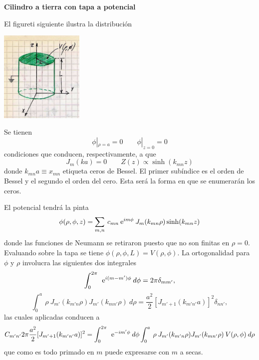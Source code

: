 \documentclass[10pt,oneside]{CBFT_book}
\begin{document}
\begin{ejemplo}{\bf Cilindro a tierra con tapa a potencial}

El figureti siguiente ilustra la distribución

\includegraphics[width=0.3\textwidth]{images/fig_ft1_cilindricasA.jpg} 

Se tienen
\[
	\phi|_{\rho=a} =0 \qquad \phi|_{z=0} =0
\]
condiciones que conducen, respectivamente, a que 
\[
	J_m(ka)=0 \qquad Z(z) \propto \sinh( k_{mn} z )
\]
donde $ k_{mn} a \equiv x_{mn} $ etiqueta ceros de Bessel. El primer subíndice es el
orden de Bessel y el segundo el orden del cero. Esta será la forma en que se enumerarán
los ceros.

El potencial tendrá la pinta
\[
	\phi(\rho,\phi,z) = \sum_{m,n} \: c_{mn} \:\mathrm{e}^{ i m \phi } \: 
	J_{m}( k_{mn} \rho ) \sinh( k_{mn} z )
\]
donde las funciones de Neumann se retiraron puesto que no son finitas en $\rho=0$.
Evaluando sobre la tapa se tiene $\phi(\rho,\phi,L) = V(\rho,\phi)$.
La ortogonalidad para $\phi$ y $\rho$ involucra las siguientes dos integrales
\[
	\int_0^{2\pi} \: \:\mathrm{e}^{ i(m-m')\phi } \: d\phi = 2 \pi \delta_{mm'},
\]
\[
	\int_0^a \: \rho \: J_{m'}( k_{m'n} \rho ) J_{m'}( k_{mn'} \rho ) \: d\rho =
	\frac{a^2}{2} [J_{m'+1}( k_{m'n'} a )]^2 \delta_{nn'},
\]
las cuales aplicadas conducen a
\[
	C_{m'n'} 2 \pi \frac{a^2}{2} [J_{m'+1}( k_{m'n'} a )]^2 =
	\int_0^{2\pi} \: \:\mathrm{e}^{ -i m'\phi } \: d\phi \int_0^a \: \rho \: 
	J_{m'}( k_{m'n} \rho ) J_{m'}( k_{mn'}\rho) \: V(\rho,\phi) \: d\rho
\]
que como es todo primado en $m$ puede expresarse con $m$ a secas.
 
\end{ejemplo}
\end{document}
